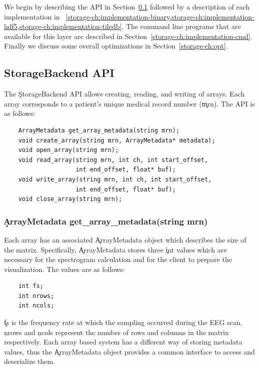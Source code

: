 We begin by describing the API in Section~\ref{storage-ch:api} followed by a
description of each implementation in
~\cref{storage-ch:implementation-binary,storage-ch:implementation-hdf5,storage-ch:implementation-tiledb}.
The command line programs that are available for this layer are described in
Section~\ref{storage-ch:implementation-cmd}. Finally we discuss some overall
optimizations in Section~\ref{storage-ch:opt}.

\subsection{StorageBackend API}\label{storage-ch:api}

The \c{StorageBackend} API allows creating, reading, and writing of arrays.
Each array corresponds to a patient's unique medical record number (\c{mrn}).
The API is as follows:

\begin{lstlisting}
    ArrayMetadata get_array_metadata(string mrn);
    void create_array(string mrn, ArrayMetadata* metadata);
    void open_array(string mrn);
    void read_array(string mrn, int ch, int start_offset,
                    int end_offset, float* buf);
    void write_array(string mrn, int ch, int start_offset,
                    int end_offset, float* buf);
    void close_array(string mrn);
\end{lstlisting}

\subsubsection{\c{ArrayMetadata get\_array\_metadata(string mrn)}}

Each array has an associated \c{ArrayMetadata} object which describes the size
of the matrix. Specifically, \c{ArrayMetadata} stores three \c{int} values which
are necessary for the spectrogram calculation and for the client to prepare the
visualization. The values are as follows:

\begin{lstlisting}
    int fs;
    int nrows;
    int ncols;
\end{lstlisting}

\c{fs} is the frequency rate at which the sampling occurred during the EEG
scan. \c{nrows} and \c{ncols} represent the number of rows and columns in the
matrix respectively. Each array based system has a different way of storing
metadata values, thus the \c{ArrayMetadata} object provides a common interface
to access and deserialize them.

